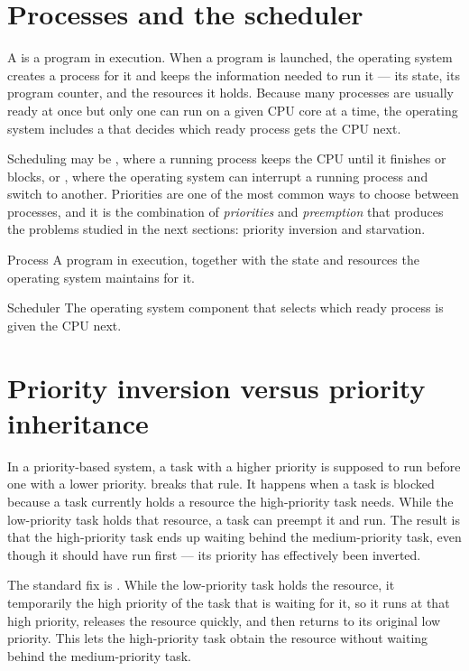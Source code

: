 \section{Processes and the scheduler}
A  is a program in execution. When a program is launched, the
operating system creates a process for it and keeps the information needed to
run it --- its state, its program counter, and the resources it holds. Because
many processes are usually ready at once but only one can run on a given CPU
core at a time, the operating system includes a  that decides
which ready process gets the CPU next.

Scheduling may be , where a running process keeps the CPU
until it finishes or blocks, or , where the operating system
can interrupt a running process and switch to another. Priorities are one of
the most common ways to choose between processes, and it is the combination of
\emph{priorities} and \emph{preemption} that produces the problems studied in
the next sections: priority inversion and starvation.

\begin{definitionbox}{Process}
A program in execution, together with the state and resources the operating
system maintains for it.
\end{definitionbox}

\begin{definitionbox}{Scheduler}
The operating system component that selects which ready process is given the
CPU next.
\end{definitionbox}

\section{Priority inversion versus priority inheritance}
In a priority-based system, a task with a higher priority is supposed to run
before one with a lower priority.  breaks that rule.
It happens when a  task is blocked because a
 task currently holds a resource the high-priority task
needs. While the low-priority task holds that resource, a
 task can preempt it and run. The result is that the
high-priority task ends up waiting behind the medium-priority task, even
though it should have run first --- its priority has effectively been
inverted.

The standard fix is . While the low-priority task
holds the resource, it temporarily  the high priority of the
task that is waiting for it, so it runs at that high priority, releases the
resource quickly, and then returns to its original low priority. This lets the
high-priority task obtain the resource without waiting behind the
medium-priority task.

